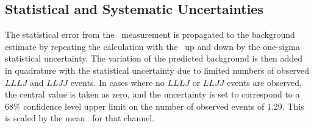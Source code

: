 %

\subsection{Statistical and Systematic Uncertainties}

The statistical error from the \ffactor\ measurement is propagated to the
background estimate by repeating the calculation with the \ffactor\ up and down
by the one-sigma statistical uncertainty. The variation of the predicted
background is then added in quadrature with the statistical uncertainty due to
limited numbers of observed $LLLJ$ and $LLJJ$ events. In cases where no $LLLJ$
or $LLJJ$ events are observed, the central value is taken as zero, and the
uncertainty is set to correspond to a 68\% confidence level upper limit on the
number of observed events of 1.29. This is scaled by the mean \ffactor\ for that
channel.

